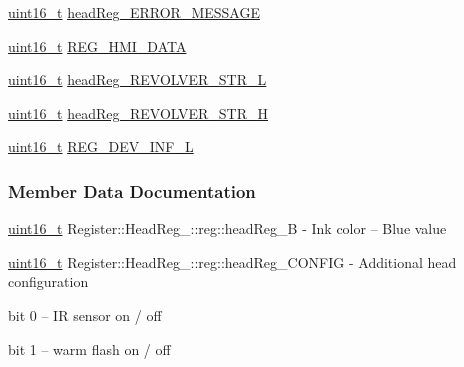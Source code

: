 \begin{DoxyCompactItemize}
\item 
\mbox{\hyperlink{settings_8h_a017dd44e68049ffdd31500a8cd01ba68}{uint16\+\_\+t}} \mbox{\hyperlink{structRegister_1_1HeadReg___1_1reg_a56da51067fbca78a2ff5dda07977822d}{head\+Reg\+\_\+\+E\+R\+R\+O\+R\+\_\+\+M\+E\+S\+S\+A\+GE}}
\item 
\mbox{\hyperlink{settings_8h_a017dd44e68049ffdd31500a8cd01ba68}{uint16\+\_\+t}} \mbox{\hyperlink{structRegister_1_1HeadReg___1_1reg_a7ebffe0c353a84658711dd32bfa5d098}{R\+E\+G\+\_\+\+H\+M\+I\+\_\+\+D\+A\+TA}}
\item 
\mbox{\hyperlink{settings_8h_a017dd44e68049ffdd31500a8cd01ba68}{uint16\+\_\+t}} \mbox{\hyperlink{structRegister_1_1HeadReg___1_1reg_aba8016656488d0408a6230a7849f3720}{head\+Reg\+\_\+\+R\+E\+V\+O\+L\+V\+E\+R\+\_\+\+S\+T\+R\+\_\+L}}
\item 
\mbox{\hyperlink{settings_8h_a017dd44e68049ffdd31500a8cd01ba68}{uint16\+\_\+t}} \mbox{\hyperlink{structRegister_1_1HeadReg___1_1reg_ac641be5b0b57efa13ba8a575497693c9}{head\+Reg\+\_\+\+R\+E\+V\+O\+L\+V\+E\+R\+\_\+\+S\+T\+R\+\_\+H}}
\item 
\mbox{\hyperlink{settings_8h_a017dd44e68049ffdd31500a8cd01ba68}{uint16\+\_\+t}} \mbox{\hyperlink{structRegister_1_1HeadReg___1_1reg_a50f41ffd2a916d11912417e92c46eeee}{R\+E\+G\+\_\+\+D\+E\+V\+\_\+\+I\+N\+F\+\_\+L}}
\end{DoxyCompactItemize}


\subsubsection{Member Data Documentation}
\mbox{\label{structRegister_1_1HeadReg___1_1reg_a9092a0ae8d0d1b213e2db78a92399b00}} 
{\footnotesize\ttfamily \mbox{\hyperlink{settings_8h_a017dd44e68049ffdd31500a8cd01ba68}{uint16\+\_\+t}} Register\+::\+Head\+Reg\+\_\+\+::reg\+::\texorpdfstring{head\+Reg\+\_\+B}{headReg\_B}} - Ink color – Blue value

\mbox{\label{structRegister_1_1HeadReg___1_1reg_a2a97b90300c35da852aaf246ab59b677}} 
{\footnotesize\ttfamily \mbox{\hyperlink{settings_8h_a017dd44e68049ffdd31500a8cd01ba68}{uint16\+\_\+t}} Register\+::\+Head\+Reg\+\_\+\+::reg\+::\texorpdfstring{head\+Reg\+\_\+\+C\+O\+N\+F\+IG}{headReg\_CONFIG}} - Additional head configuration 
\begin{DoxyCompactItemize}
\item bit 0 – IR sensor on / off
\item bit 1 – warm flash on / off
\end{DoxyCompactItemize}

